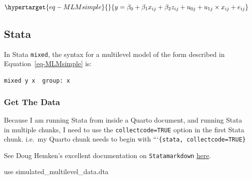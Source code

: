 \documentclass[
  letterpaper,
  DIV=11,
  numbers=noendperiod,
  oneside]{scrreprt}
\newenvironment{Shaded}{\begin{snugshade}}{\end{snugshade}}
\newcommand{\KeywordTok}[1]{\textcolor[rgb]{0.00,0.23,0.31}{#1}}
\newcommand{\NormalTok}[1]{\textcolor[rgb]{0.00,0.23,0.31}{#1}}
\begin{document}
\begin{equation}\protect\hypertarget{eq-MLMsimple}{}{y = \beta_0 + \beta_1 x_{ij} + \beta_2 z_{ij} + u_{0j} + u_{1j} \times x_{ij} + e_{ij}}\label{eq-MLMsimple}\end{equation}

\subsection{Stata}

In Stata \texttt{mixed}, the syntax for a multilevel model of the form
described in Equation~\ref{eq-MLMsimple} is:

\texttt{mixed\ y\ x\ \textbar{}\textbar{}\ group:\ x}

\hypertarget{get-the-data}{%
\subsubsection{Get The Data}\label{get-the-data}}

\begin{tcolorbox}[enhanced jigsaw, arc=.35mm, coltitle=black, bottomtitle=1mm, colbacktitle=quarto-callout-tip-color!10!white, opacityback=0, colback=white, colframe=quarto-callout-tip-color-frame, opacitybacktitle=0.6, breakable, title=\textcolor{quarto-callout-tip-color}{\faLightbulb}\hspace{0.5em}{Tip For Running Stata From Quarto}, leftrule=.75mm, toptitle=1mm, bottomrule=.15mm, rightrule=.15mm, titlerule=0mm, toprule=.15mm, left=2mm]

Because I am running Stata from inside a Quarto document, and running
Stata in multiple chunks, I need to use the \texttt{collectcode=TRUE}
option in the first Stata chunk. i.e.~my Quarto chunk needs to begin
with ```\texttt{\{stata,\ collectcode=TRUE\}}

See Doug Hemken's excellent documentation on \texttt{Statamarkdown}
\href{https://www.ssc.wisc.edu/~hemken/Stataworkshops/Statamarkdown/linking-code-blocks.html\#linking-code-blocks-1}{here}.

\end{tcolorbox}

\begin{Shaded}
\begin{Highlighting}[]

\KeywordTok{use}\NormalTok{ simulated\_multilevel\_data.dta}
\end{Highlighting}
\end{Shaded}
\end{document}
